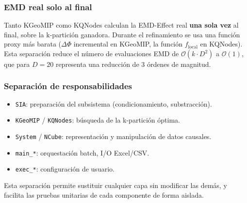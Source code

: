 \subsubsection*{EMD real solo al final }

Tanto KGeoMIP como KQNodes calculan la EMD-Effect real \textbf{una sola vez} al final,
sobre la k-partición ganadora. Durante el refinamiento se usa una función proxy más
barata ($\Delta\Phi$ incremental en KGeoMIP, la función $f_{\text{local}}$ en KQNodes).
Esta separación reduce el número de evaluaciones EMD de $\mathcal{O}(k \cdot D^2)$ a
$\mathcal{O}(1)$, que para $D=20$ representa una reducción de 3 órdenes de magnitud.

\subsubsection*{Separación de responsabilidades}

\begin{itemize}
  \item \texttt{SIA}: preparación del subsistema (condicionamiento, substracción).
  \item \texttt{KGeoMIP} / \texttt{KQNodes}: búsqueda de la k-partición óptima.
  \item \texttt{System} / \texttt{NCube}: representación y manipulación de datos causales.
  \item \texttt{main\_*}: orquestación batch, I/O Excel/CSV.
  \item \texttt{exec\_*}: configuración de usuario.
\end{itemize}
Esta separación permite sustituir cualquier capa sin modificar las demás, y facilita
las pruebas unitarias de cada componente de forma aislada.
